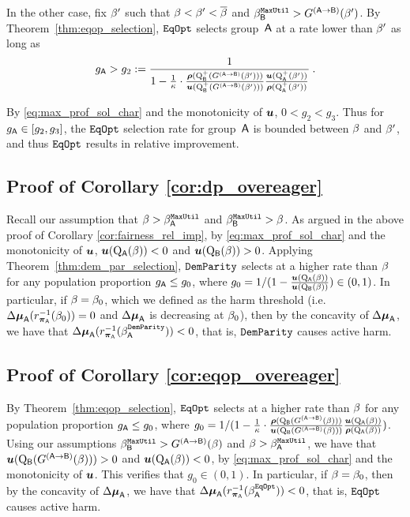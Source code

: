 		In the other case, fix $\beta'$ such that $\beta<\beta'<\overline{\beta}$ and $\beta_{\mathsf{B}}^{\mathtt{MaxUtil}} > G^{(\mathsf{A}\to\mathsf{B})}(\beta')$. By Theorem~\ref{thm:eqop_selection}, $\mathtt{EqOpt}$ selects group~$\mathsf{A}$ at a rate lower than $\beta'$ as long as
		$$g_{\mathsf{A}}>g_2 := \frac{1}{1-\frac{1}{\kappa}\cdot\frac{\boldsymbol{\rho}(\mathrm{Q}^+_{\mathsf{B}}(G^{(\mathsf{A}\to\mathsf{B})}(\beta')))}{\boldsymbol{u}(\mathrm{Q}^+_{\mathsf{B}}(G^{(\mathsf{A}\to\mathsf{B})}(\beta')))}\frac{\boldsymbol{u}(\mathrm{Q}^+_{\mathsf{A}}(\beta'))}{\boldsymbol{\rho}(\mathrm{Q}^+_{\mathsf{A}}(\beta'))}}\:.$$

		By \eqref{eq:max_prof_sol_char} and the monotonicity of $\boldsymbol{u}$, $0<g_2<g_3$. Thus for $g_{\mathsf{A}}\in[g_2,g_3]$, the $\mathtt{EqOpt}$ selection rate for group~$\mathsf{A}$ is bounded between $\beta$ and $\beta'$, and thus $\mathtt{EqOpt}$ results in relative improvement.


	\subsection{Proof of Corollary \ref{cor:dp_overeager}}
	
	Recall our assumption that $\beta > \beta_{\mathsf{A}}^{\mathtt{MaxUtil}}$ and  $\beta_{\mathsf{B}}^{\mathtt{MaxUtil}} > \beta$.
	As argued in the above proof of Corollary \ref{cor:fairness_rel_imp}, by \eqref{eq:max_prof_sol_char} and the monotonicity of $\boldsymbol{u}$, $\boldsymbol{u}(\mathrm{Q}_{\mathsf{A}}(\beta))<0$ and $\boldsymbol{u}(\mathrm{Q}_{\mathsf{B}}(\beta))>0$. 
	 Applying Theorem~\ref{thm:dem_par_selection}, $\mathtt{DemParity}$ selects at a higher rate than $\beta$ for any population proportion $g_{\mathsf{A}} \leq g_0$, where $g_0 = 1/(1-\frac{\boldsymbol{u}(\mathrm{Q}_{\mathsf{A}}(\beta))}{\boldsymbol{u}(\mathrm{Q}_{\mathsf{B}}(\beta))}) \in (0,1)$. In particular, if $\beta=\beta_0$, which we defined as the harm threshold (i.e. $\Delta\boldsymbol{\mu}_{\mathsf{A}}(r^{-1}_{\boldsymbol{\pi}_{\mathsf{A}}} (\beta_0))=0$ and $\Delta\boldsymbol{\mu}_{\mathsf{A}}$ is decreasing at $\beta_0$), then by the concavity of $\Delta\boldsymbol{\mu}_{\mathsf{A}}$, we have that  $\Delta\boldsymbol{\mu}_{\mathsf{A}}(r^{-1}_{\boldsymbol{\pi}_{\mathsf{A}}}(\beta^{\mathtt{DemParity}}_{\mathsf{A}}))< 0$, that is, $\mathtt{DemParity}$ causes active harm.


\subsection{Proof of Corollary \ref{cor:eqop_overeager}}

		By Theorem~\ref{thm:eqop_selection}, $\mathtt{EqOpt}$ selects at a higher rate than $\beta$ for any population proportion $g_{\mathsf{A}} \leq g_0$, where $g_0 =  1/(1-\frac{1}{\kappa}\cdot\frac{\boldsymbol{\rho}(\mathrm{Q}_{\mathsf{B}}(G^{(\mathsf{A}\to\mathsf{B})}(\beta)))}{\boldsymbol{u}(\mathrm{Q}_{\mathsf{B}}(G^{(\mathsf{A}\to\mathsf{B})}(\beta)))}\frac{\boldsymbol{u}(\mathrm{Q}_{\mathsf{A}}(\beta))}{\boldsymbol{\rho}(\mathrm{Q}_{\mathsf{A}}(\beta))})$. Using our assumptions $\beta_{\mathsf{B}}^{\mathtt{MaxUtil}} > G^{(\mathsf{A}\to\mathsf{B})}(\beta)$ and $\beta > \beta_{\mathsf{A}}^{\mathtt{MaxUtil}}$, we have that $\boldsymbol{u}(\mathrm{Q}_{\mathsf{B}}(G^{(\mathsf{A}\to\mathsf{B})}(\beta))) > 0$ and $\boldsymbol{u}(\mathrm{Q}_{\mathsf{A}}(\beta)) < 0$, by \eqref{eq:max_prof_sol_char} and the monotonicity of $\boldsymbol{u}$. This verifies that $g_0 \in (0,1)$. In particular, if $\beta=\beta_0$, then by the concavity of $\Delta\boldsymbol{\mu}_{\mathsf{A}}$, we have that  $\Delta\boldsymbol{\mu}_{\mathsf{A}}(r^{-1}_{\boldsymbol{\pi}_{\mathsf{A}}}(\beta^{\mathtt{EqOpt}}_{\mathsf{A}}))< 0$, that is, $\mathtt{EqOpt}$ causes active harm.

